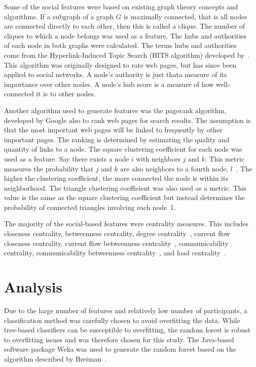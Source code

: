 \documentclass[10pt,twocolumn,conference]{IEEEtran}
\begin{document}
Some of the social features were based on existing graph theory concepts and algorithms.
If a subgraph of a graph $G$ is maximally connected, that is all nodes are connected directly to each other, then this is called a clique.
The number of cliques to which a node belongs was used as a feature.
The hubs and authorities of each node in both graphs were calculated.
The terms hubs and authorities come from the Hyperlink-Induced Topic Search (HITS algorithm) developed by~\cite{kleinberg_hubs_1999}.
This algorithm was originally designed to rate web pages, but has since been applied to social networks.
A node's authority is just that\textemdash{}a measure of its importance over other nodes.
A node's hub score is a measure of how well-connected it is to other nodes.

Another algorithm used to generate features was the pagerank algorithm, developed by Google 
\cite{page_pagerank_1999} also to rank web pages for search results.
The assumption is that the most important web pages will be linked to frequently by other important pages.
The ranking is determined by estimating the quality and quantity of links to a node.
The square clustering coefficient for each node was used as a feature.
Say there exists a node $i$ with neighbors $j$ and $k$.
This metric measures the probability that $j$ and $k$ are also neighbors to a fourth node, $l$~\cite{lind_cycles_2005}.
The higher the clustering coefficient, the more connected the node is within its neighborhood.
The triangle clustering coefficient was also used as a metric.
This value is the same as the square clustering coefficient but instead determines the probability of connected triangles involving each node~\cite{saramaki_generalizations_2007}1.

The majority of the social-based features were centrality measures.
This includes closeness centrality, betweenness centrality, degree centrality~\cite{borgatti2011analyzing}, current flow closeness centrality, current flow betweenness centrality~\cite{brandes2005centrality}, communicability centrality, communicability betweenness centrality~\cite{estrada2008communicability}, and load centrality~\cite{newman2001scientific}.

\section{Analysis} \label{Analysis}
Due to the large number of features and relatively low number of participants, a classification method was carefully chosen to avoid overfitting the data.
While tree-based classifiers can be susceptible to overfitting, the random forest is robust to overfitting issues and was therefore chosen for this study.
The Java-based software package Weka was used to generate the random forest based on the algorithm described by Breiman~\cite{Breiman2001}.
\end{document}
